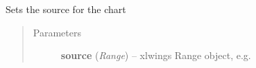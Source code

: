 \documentclass[letterpaper,11pt,english]{sphinxmanual}
\begin{document}
\begin{fulllineitems}
\begin{fulllineitems}
\end{fulllineitems}


\begin{fulllineitems}
\label{chart:xlwings.Chart.set_source_data}
Sets the source for the chart
\begin{quote}\begin{description}
\item[{Parameters}] \leavevmode
\textbf{source} (\emph{Range}) -- xlwings Range object, e.g. 

\end{description}\end{quote}

\end{fulllineitems}


\end{fulllineitems}




\renewcommand{\indexname}{Index}
\printindex
\end{document}
